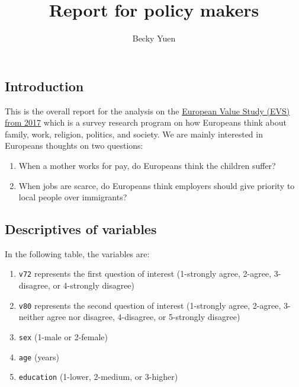 \documentclass[
]{article}
\title{Report for policy makers}
\author{Becky Yuen}
\date{}
\providecommand{\tightlist}{%
  \setlength{\itemsep}{0pt}\setlength{\parskip}{0pt}}
\begin{document}
\maketitle

\hypertarget{introduction}{%
\subsection{Introduction}\label{introduction}}

This is the overall report for the analysis on the
\href{https://search.gesis.org/research_data/ZA7500}{European Value
Study (EVS) from 2017} which is a survey research program on how
Europeans think about family, work, religion, politics, and society. We
are mainly interested in Europeans thoughts on two questions:

\begin{enumerate}
\def\labelenumi{\arabic{enumi}.}
\tightlist
\item
  When a mother works for pay, do Europeans think the children suffer?
\item
  When jobs are scarce, do Europeans think employers should give
  priority to local people over immigrants?
\end{enumerate}

\hypertarget{descriptives-of-variables}{%
\subsection{Descriptives of variables}\label{descriptives-of-variables}}

In the following table, the variables are:

\begin{enumerate}
\def\labelenumi{\arabic{enumi}.}
\tightlist
\item
  \texttt{v72} represents the first question of interest (1-strongly
  agree, 2-agree, 3-disagree, or 4-strongly disagree)
\item
  \texttt{v80} represents the second question of interest (1-strongly
  agree, 2-agree, 3-neither agree nor disagree, 4-disagree, or
  5-strongly disagree)
\item
  \texttt{sex} (1-male or 2-female)
\item
  \texttt{age} (years)
\item
  \texttt{education} (1-lower, 2-medium, or 3-higher)
\end{enumerate}
\end{document}

